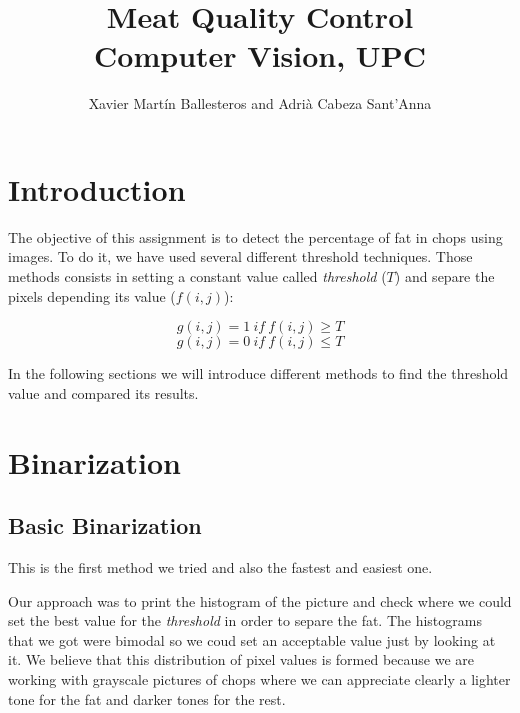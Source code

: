 \documentclass[12]{article}
\author{Xavier Martín Ballesteros and Adrià Cabeza Sant'Anna}
\title{Meat Quality Control \\ \large{Computer Vision, UPC}}
\begin{document}
\maketitle
  \vspace{1cm}

\newpage
\tableofcontents
\section{Introduction}
The objective of this assignment is to detect the percentage of fat in chops using images. To do it, we have used several different threshold techniques. Those methods consists in setting a constant value called \textit{threshold} ($T$) and separe the pixels depending its value ($ f(i,j)$):
\vspace{-0.6cm}
\begin{center}
$$ g(i,j)=1\ if\ f(i,j) \geq T$$ 
$$ g(i,j)=0\ if\ f(i,j) \leq T$$
\end{center}

In the following sections we will introduce different methods to find the threshold value and compared its results. 

\section{Binarization}
\subsection{Basic Binarization}
This is the first method we tried and also the fastest and easiest one. 

\noindent Our approach was to print the histogram of the picture and check where we could set the best value for the \textit{threshold} in order to separe the fat. The histograms that we got were bimodal so we coud set an acceptable value just by looking at it. We believe that this distribution of pixel values is formed because we are working with grayscale pictures of chops where we can appreciate clearly a lighter tone for the fat and darker tones for the rest.
\end{document}
